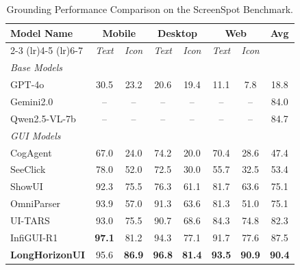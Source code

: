 \documentclass{article} %
\begin{document}
\begin{table}[!t]
\centering
\caption{Grounding Performance Comparison on the ScreenSpot Benchmark.}
\label{tab:ground_performance}
\footnotesize %
\setlength{\tabcolsep}{10pt} %
\begin{tabular}{@{}lccccccc@{}}
\toprule
\textbf{Model Name} &
\multicolumn{2}{c}{\textbf{Mobile}} &
\multicolumn{2}{c}{\textbf{Desktop}} &
\multicolumn{2}{c}{\textbf{Web}} &
\textbf{Avg} \\
\cmidrule(lr){2-3} \cmidrule(lr){4-5} \cmidrule(lr){6-7}
& \textit{Text} & \textit{Icon} & \textit{Text} & \textit{Icon} & \textit{Text} & \textit{Icon} & \\
\midrule
\multicolumn{8}{l}{\emph{Base Models}} \\
\midrule
GPT-4o \citep{openai2024gpt4technicalreport} & 30.5 & 23.2 & 20.6 & 19.4 & 11.1 & 7.8 & 18.8 \\
Gemini2.0                                     & --   & --   & --   & --   & --   & --   & 84.0 \\
Qwen2.5-VL-7b \citep{bai2023qwentechnicalreport} & -- & --   & --   & --   & --   & --   & 84.7 \\
\midrule
\multicolumn{8}{l}{\emph{GUI Models}} \\
\midrule
CogAgent \citep{Hong_2024_CVPR_CogAgent}  & 67.0 & 24.0 & 74.2 & 20.0 & 70.4 & 28.6 & 47.4 \\
SeeClick \citep{cheng_2024_seeclick}      & 78.0 & 52.0 & 72.5 & 30.0 & 55.7 & 32.5 & 53.4 \\
ShowUI \citep{Lin_2025_CVPR}              & 92.3 & 75.5 & 76.3 & 61.1 & 81.7 & 63.6 & 75.1 \\
OmniParser \citep{lu2024omniparserpurevisionbased}  & 93.9 & 57.0 & 91.3 & 63.6 & 81.3 & 51.0 & 75.1 \\
UI-TARS \citep{qin2025_uitars}            & 93.0 & 75.5 & 90.7 & 68.6 & 84.3 & 74.8 & 82.3 \\
InfiGUI-R1 \citep{liu2025_infiguir1}      & \textbf{97.1} & 81.2 & 94.3 & 77.1 & 91.7 & 77.6 & 87.5 \\
\midrule
\rowcolor{black!4}
\textbf{LongHorizonUI} & 95.6 & \textbf{86.9} & \textbf{96.8} & \textbf{81.4} & \textbf{93.5} & \textbf{90.9} & \textbf{90.4} \\
\bottomrule
\end{tabular}
\end{table}
\end{document}

